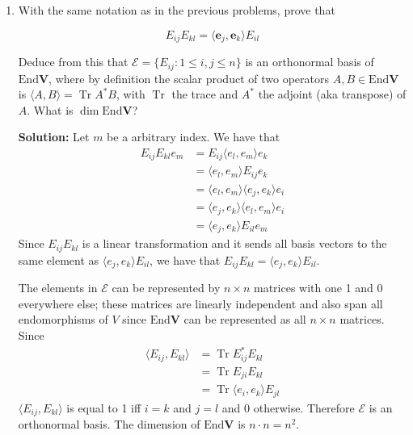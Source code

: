 \documentclass{report}
\newcommand{\solution}{\textbf{Solution: }}
\newcommand{\inner}[2]{\langle #1, #2 \rangle}
\begin{document}
\begin{enumerate}
	\noindent
	What is the matrix of $E_{ij}$ relative to $\mathcal{B}$?
	
	\solution 
	Since the basis is orthonormal,
	the expression $E_{ij}e_k$ is equal to $e_i$ when $j=k$ and 0 when $j \neq k$.
	In other words, $E_{ij}$ sends the basis vector $e_j$ to the basis vector $e_i$.
	Thus the matrix of $E_{ij}$ will contain a 1 at the index $(i,j)$ and 0 everywhere else. 
	\medskip
	\item
	With the same notation as in the previous problems, prove that 
	
		\begin{equation*}
			E_{ij} E_{kl} = \langle \mathbf{e}_j,\mathbf{e}_k \rangle E_{il}
		\end{equation*}
		
	\noindent
	Deduce from this that $\mathcal{E} = \{ E_{ij} \colon 1 \leq i , j \leq n\}$
	is an orthonormal basis of $\mathrm{End} \mathbf{V}$, where by definition the scalar product of
	two operators $A,B \in \mathrm{End}\mathbf{V}$ is
	$\langle A,B \rangle = \operatorname{Tr} A^*B$, with $\operatorname{Tr}$ the trace and $A^*$ the
	adjoint (aka transpose) of $A$. What is $\dim \mathrm{End}\mathbf{V}$?

	\solution
	Let $m$ be a arbitrary index.
	We have that 
	\begin{align*}
		E_{ij}E_{kl}e_m
		&= E_{ij}\inner{e_l}{e_m}e_k \\
		&= \inner{e_l}{e_m}E_{ij}e_k \\
		&= \inner{e_l}{e_m}\inner{e_j}{e_k}e_i \\
		&= \inner{e_j}{e_k}\inner{e_l}{e_m}e_i \\
		&= \inner{e_j}{e_k}E_{il}e_m
	\end{align*}
	Since $E_{ij}E_{kl}$ is a linear transformation and it sends all
	basis vectors to the same element as $\inner{e_j}{e_k}E_{il}$,
	we have that
	$E_{ij}E_{kl} = \inner{e_j}{e_k}E_{il}$.

	The elements in $\mathcal{E}$ can be represented by 
	$n \times n$ matrices with one 1 and 0 everywhere else;
	these matrices are linearly independent and also span
	all endomorphisms of $V$ since $\mathrm{End} \mathbf{V}$ 
	can be represented as all $n \times n$ matrices.
	Since 
	\begin{align*}
		 \inner{E_{ij}}{E_{kl}} 
		 &= \operatorname{Tr} E_{ij}^* E_{kl} \\
		 &= \operatorname{Tr} E_{ji} E_{kl} \\
		 &= \operatorname{Tr} \inner{e_i}{e_k}E_{jl}
	\end{align*}
	$\inner{E_{ij}}{E_{kl}}$ is equal to 1 iff $i = k$ and $j = l$
	and 0 otherwise. Therefore $\mathcal{E}$ is an orthonormal basis.
	The dimension of $\mathrm{End} \mathbf{V}$ is $n \cdot n = n^2$.


\end{enumerate}
\end{document}
